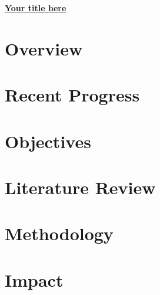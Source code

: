 \documentclass[12pt,letterpaper]{article}
\begin{document}
\begin{center}
\textbf{\underline{Your title here}}
\end{center}


\section{Overview}

\section{Recent Progress}

\section{Objectives}

\section{Literature Review}

\section{Methodology}

\section{Impact}

\clearpage


\end{document}
